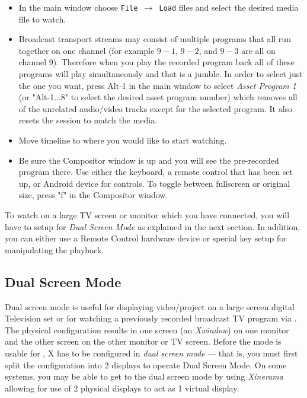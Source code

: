 \begin{itemize}
    \item In the main window choose   \texttt{File $\rightarrow$ Load} files  and select the desired media file to watch.
    \item Broadcast transport streams may consist of multiple programs that all run together on one  channel (for example $9-1$, $9-2$, and $9-3$ are all on channel 9). Therefore when you play the
    recorded program back all of these programs will play simultaneously and that is a jumble. In order to select just the one you want, press Alt-1 in the main window to select \textit{Asset Program 1} (or "Alt-1...8" to select the desired asset program number) which removes all of the unrelated audio/video tracks except for the selected program. It also resets the session to match the media.
    \item Move timeline to where you would like to start watching.
    \item Be sure the Compositor window is up and you will see the pre-recorded program there.	Use either the keyboard, a remote control that has been set up, or Android device for controls.  To toggle between fullscreen or original size, press "f" in the Compositor window.
\end{itemize}

To watch on a large TV screen or monitor which you have connected, you will have to setup for \textit{Dual Screen Mode} as explained in the next section.  In addition, you can either use a Remote Control hardware device or special key setup for manipulating the playback.

\subsection{Dual Screen Mode}%
\label{sub:dual_screen_mode}

Dual screen mode is useful for displaying \CGG{} video/project on a large screen digital Television set or for watching a previously recorded broadcast TV program via \CGG{}.  The physical configuration results in one screen (an \textit{Xwindow}) on one monitor and the other screen on the other monitor or TV screen.  Before the mode is usable for \CGG{}, X has to be configured in \textit{dual screen mode} --- that is, you must first split the configuration into 2 displays to operate Dual Screen Mode.  On some systems, you may be able to get to the dual screen mode by using \textit{Xinerama} allowing for use of 2 physical displays to act as 1 virtual display.

